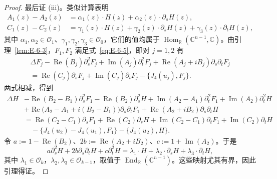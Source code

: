 \begin{proof}
最后证 (iii)。类似计算表明
\begin{align*}
  A_1(z)-A_2(z)&=\alpha_1(z)\cdot H(z)
                     +\alpha_2(z)\cdot\partial_sH(z),\\
  C_1(z)-C_2(z)&=\gamma_1(z)\cdot H(z)
                     +\gamma_2(z)\cdot\partial_sH(z)
                     +\gamma_3(z)\cdot\partial_tH(z),
\end{align*}
其中 $\alpha_1,\alpha_2\in\mathcal O_1$、$\gamma_1,\gamma_2,\gamma_3\in\mathcal O_0$，它们的值均属于 $\operatorname{Hom}_{\mathbb R}(\mathbb C^{n-1},\mathbb C)$。由引理~\ref{lem:E-6-3}，$F_1,F_2$ 满足式~\eqref{eq:E-6-5}，即对 $j=1,2$ 有
\begin{multline*}
  \Delta F_j-\operatorname{Re}(B_j)\partial_s^2F_j
   +\operatorname{Im}(A_j)\partial_t^2F_j
   +\operatorname{Re}(A_j+iB_j)\partial_s\partial_tF_j\\
  =\operatorname{Re}(C_j)\partial_sF_j
    +\operatorname{Im}(C_j)\partial_tF_j
    -\{J_4(u_j),F_j\}.
\end{multline*}
两式相减，得到
\begin{align*}
  \Delta H&-\operatorname{Re}(B_2-B_1)\partial_s^2F_1
    -\operatorname{Re}(B_2)\partial_s^2H
    +\operatorname{Im}(A_2-A_1)\partial_t^2F_1
    +\operatorname{Im}(A_2)\partial_t^2H\\
  &+\operatorname{Re}\bigl(A_2-A_1+i(B_2-B_1)\bigr)
       \partial_s\partial_tF_1
    +\operatorname{Re}(A_2+iB_2)\partial_s\partial_tH\\
  &=\operatorname{Re}(C_2-C_1)\partial_sF_1
     +\operatorname{Re}(C_2)\partial_sH
     +\operatorname{Im}(C_2-C_1)\partial_tF_1
     +\operatorname{Im}(C_2)\partial_tH\\
  &\quad-\{J_4(u_2)-J_4(u_1),F_1\}-\{J_4(u_2),H\}.
\end{align*}
令 $a:=1-\operatorname{Re}(B_2)$、$2b:=\operatorname{Re}(A_2+iB_2)$、$c:=1+\operatorname{Im}(A_2)$。于是
\[
  a\partial_s^2H+2b\partial_s\partial_tH+c\partial_t^2H
   =\lambda_1\cdot H+\lambda_2\cdot\partial_sH
                        +\lambda_3\cdot\partial_tH,
\]
其中 $\lambda_1\in\mathcal O_k$，$\lambda_2,\lambda_3\in\mathcal O_{k-1}$，取值于 $\operatorname{End}_{\mathbb R}(\mathbb C^{n-1})$。这些映射尤其有界，因此引理得证。
\end{proof}

